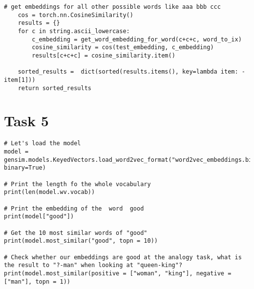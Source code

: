 \documentclass{article}
\begin{document}
\begin{enumerate}[label=(\alph*)]
\begin{lstlisting}[style=Python, tabsize=2]
	# get embeddings for all other possible words like aaa bbb ccc
	cos = torch.nn.CosineSimilarity()
	results = {}
	for c in string.ascii_lowercase:
		c_embedding = get_word_embedding_for_word(c+c+c, word_to_ix)
		cosine_similarity = cos(test_embedding, c_embedding)
		results[c+c+c] = cosine_similarity.item()
		
	sorted_results =  dict(sorted(results.items(), key=lambda item: -item[1]))
	return sorted_results
		\end{lstlisting}
	\end{enumerate}

	\section*{Task 5}
	\begin{lstlisting}[style=Python, tabsize=2]
# Let's load the model
model = gensim.models.KeyedVectors.load_word2vec_format("word2vec_embeddings.bin", binary=True)

# Print the length fo the whole vocabulary 
print(len(model.wv.vocab))

# Print the embedding of the  word  good
print(model["good"])

# Get the 10 most similar words of "good"
print(model.most_similar("good", topn = 10))

# Check whether our embeddings are good at the analogy task, what is the result to "?-man" when looking at "queen-king"?
print(model.most_similar(positive = ["woman", "king"], negative = ["man"], topn = 1))
	\end{lstlisting}
	
\end{document}

